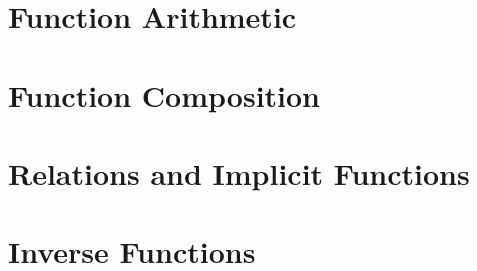 \begin{comment}
\section{Graphs of Functions}



\newpage
\end{comment}

\section{Function Arithmetic}



\newpage

\section{Function Composition}



\newpage

\begin{comment}
\section{Transformations of Graphs}



\newpage
\end{comment}

\section{Relations and Implicit Functions}



\newpage

\section{Inverse Functions}



\newpage
